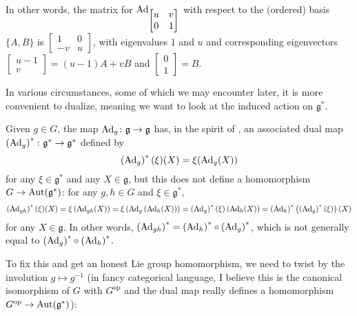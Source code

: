 \begin{example}
\begin{align*}
	\end{align*}
	In other words, the matrix for $\operatorname{Ad}_{\begin{bmatrix} u & v \\ 0 & 1 \end{bmatrix}}$ with respect to the (ordered) basis $\{A,B\}$ is $\begin{bmatrix} 1 & 0 \\ -v & u \end{bmatrix}$, with eigenvalues $1$ and $u$ and corresponding eigenvectors $\begin{bmatrix} u-1 \\ v \end{bmatrix} = (u-1)A+vB$ and $\begin{bmatrix}0\\ 1 \end{bmatrix} = B$.
\end{example}

In various circumstances, some of which we may encounter later, it is more convenient to dualize, meaning we want to look at the induced action on $\mathfrak{g}^\ast$.

Given $g \in G$, the map $\operatorname{Ad}_g \colon\thinspace\! \mathfrak{g} \to \mathfrak{g}$ has, in the spirit of , an associated dual map $\left(\operatorname{Ad}_g\right)^\ast \colon\thinspace\! \mathfrak{g}^\ast \to \mathfrak{g}^\ast$ defined by
\[
	\left(\operatorname{Ad}_g\right)^\ast (\xi)(X) = \xi(\operatorname{Ad}_g(X))
\]
for any $\xi \in \mathfrak{g}^\ast$ and any $X \in \mathfrak{g}$, but this does not define a homomorphism $G \to \operatorname{Aut}(\mathfrak{g}^\ast)$: for any $g,h \in G$ and $\xi \in \mathfrak{g}^\ast$,
\[
	\left(\operatorname{Ad}_{gh}\right)^\ast(\xi)(X) = \xi\left(\operatorname{Ad}_{gh}(X)\right) = \xi\left(\operatorname{Ad}_g\left(\operatorname{Ad}_h(X)\right)\right) = \left(\operatorname{Ad}_g\right)^\ast(\xi)\left(\operatorname{Ad}_h(X)\right) = \left(\operatorname{Ad}_h\right)^\ast \left(\left(\operatorname{Ad}_g\right)^\ast(\xi)\right)(X)
\]
for any $X \in \mathfrak{g}$. In other words, $\left(\operatorname{Ad}_{gh}\right)^\ast = \left(\operatorname{Ad}_h\right)^\ast \circ \left(\operatorname{Ad}_g\right)^\ast$, which is not generally equal to $\left(\operatorname{Ad}_g\right)^\ast \circ \left(\operatorname{Ad}_h\right)^\ast$.

To fix this and get an honest Lie group homomorphism, we need to twist by the involution $g \mapsto g^{-1}$ (in fancy categorical language, I believe this is the canonical isomorphism of $G$ with $G^{\text{op}}$ and the dual map really defines a homomorphism $G^{\text{op}} \to \operatorname{Aut}(\mathfrak{g}^\ast)$):

